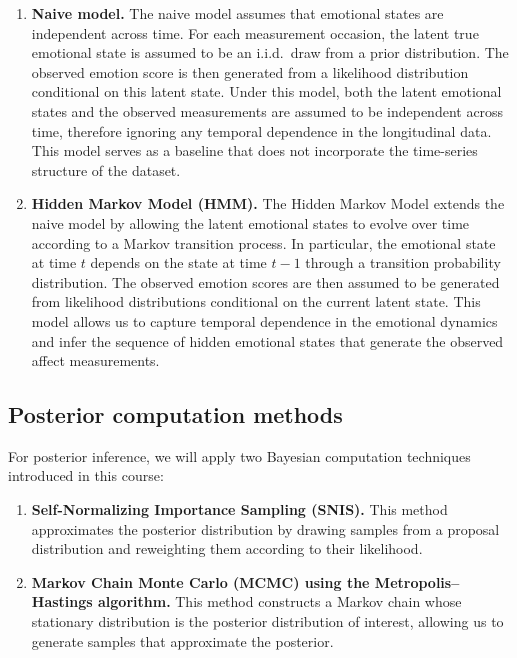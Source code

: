 \documentclass[a4paper,11pt]{article}
\begin{document}
\begin{enumerate}

\item \textbf{Naive model.}  
The naive model assumes that emotional states are independent across time. 
For each measurement occasion, the latent true emotional state is assumed to be an i.i.d.\ draw from a prior distribution. 
The observed emotion score is then generated from a likelihood distribution conditional on this latent state. 
Under this model, both the latent emotional states and the observed measurements are assumed to be independent across time, 
therefore ignoring any temporal dependence in the longitudinal data. 
This model serves as a baseline that does not incorporate the time-series structure of the dataset.

\item \textbf{Hidden Markov Model (HMM).}  
The Hidden Markov Model extends the naive model by allowing the latent emotional states to evolve over time according to a Markov transition process. In particular, the emotional state at time $t$ depends on the state at time $t-1$ through a transition probability distribution. The observed emotion scores are then assumed to be generated from likelihood distributions conditional on the current latent state. This model allows us to capture temporal dependence in the emotional dynamics and infer the sequence of hidden emotional states that generate the observed affect measurements.

\end{enumerate}

\subsection{Posterior computation methods}

For posterior inference, we will apply two Bayesian computation techniques introduced 
in this course:

\begin{enumerate}

\item \textbf{Self-Normalizing Importance Sampling (SNIS).}  
This method approximates the posterior distribution by drawing samples from a proposal 
distribution and reweighting them according to their likelihood.

\item \textbf{Markov Chain Monte Carlo (MCMC) using the Metropolis--Hastings algorithm.}  
This method constructs a Markov chain whose stationary distribution is the posterior 
distribution of interest, allowing us to generate samples that approximate the posterior.

\end{enumerate}
\end{document}
